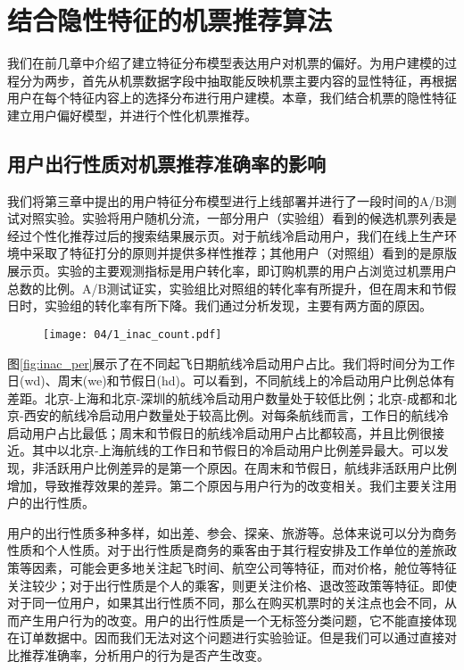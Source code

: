 
\chapter{结合隐性特征的机票推荐算法}
\label{chap:latent}
我们在前几章中介绍了建立特征分布模型表达用户对机票的偏好。为用户建模的过程分为两步，首先从机票数据字段中抽取能反映机票主要内容的显性特征，再根据用户在每个特征内容上的选择分布进行用户建模。本章，我们结合机票的隐性特征建立用户偏好模型，并进行个性化机票推荐。

\section{用户出行性质对机票推荐准确率的影响}

我们将第三章中提出的用户特征分布模型进行上线部署并进行了一段时间的A/B测试对照实验。实验将用户随机分流，一部分用户（实验组）看到的候选机票列表是经过个性化推荐过后的搜索结果展示页。对于航线冷启动用户，我们在线上生产环境中采取了特征打分的原则并提供多样性推荐；其他用户（对照组）看到的是原版展示页。实验的主要观测指标是用户转化率，即订购机票的用户占浏览过机票用户总数的比例。A/B测试证实，实验组比对照组的转化率有所提升，但在周末和节假日时，实验组的转化率有所下降。我们通过分析发现，主要有两方面的原因。

\begin{figure}
 \centering
 \texttt{[image: 04/1\_inac\_count.pdf]}
\end{figure}

图\ref{fig:inac_per}展示了在不同起飞日期航线冷启动用户占比。我们将时间分为工作日(wd)、周末(we)和节假日(hd)。可以看到，不同航线上的冷启动用户比例总体有差距。北京-上海和北京-深圳的航线冷启动用户数量处于较低比例；北京-成都和北京-西安的航线冷启动用户数量处于较高比例。对每条航线而言，工作日的航线冷启动用户占比最低；周末和节假日的航线冷启动用户占比都较高，并且比例很接近。其中以北京-上海航线的工作日和节假日的冷启动用户比例差异最大。可以发现，非活跃用户比例差异的是第一个原因。在周末和节假日，航线非活跃用户比例增加，导致推荐效果的差异。第二个原因与用户行为的改变相关。我们主要关注用户的出行性质。

用户的出行性质多种多样，如出差、参会、探亲、旅游等。总体来说可以分为商务性质和个人性质。对于出行性质是商务的乘客由于其行程安排及工作单位的差旅政策等因素，可能会更多地关注起飞时间、航空公司等特征，而对价格，舱位等特征关注较少；对于出行性质是个人的乘客，则更关注价格、退改签政策等特征。即使对于同一位用户，如果其出行性质不同，那么在购买机票时的关注点也会不同，从而产生用户行为的改变。用户的出行性质是一个无标签分类问题，它不能直接体现在订单数据中。因而我们无法对这个问题进行实验验证。但是我们可以通过直接对比推荐准确率，分析用户的行为是否产生改变。




